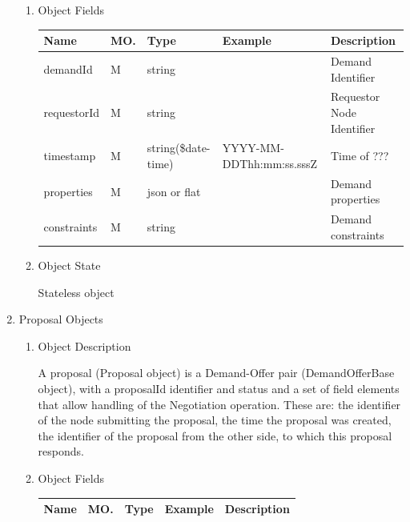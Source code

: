 \begin{enumerate}
\begin{enumerate}

\item Object Fields

\begin{center}
\begin{tabular}{|p{3cm}|l|p{3cm}|p{3cm}|p{4cm}|} 
\hline
\rowcolor{lightgray}	Name	& MO.	& Type	& Example & 	Description \\
\hline

demandId 	& M & string  & 		& Demand Identifier \\
\hline 		

requestorId & M & string  & 		& Requestor Node Identifier \\
\hline

timestamp	& M	& 	string(\$date-time)	& YYYY-MM-DDThh:mm:ss.sssZ	&	Time of ???  \\
\hline

properties	& M	& 	json or flat	&		&	Demand properties \\ 
\hline

constraints	& M	& 	string	&		&	Demand constraints \\ 
\hline

\end{tabular}
\end{center}


\item Object State

Stateless object

\end{enumerate}

\item Proposal Objects

\begin{enumerate}

\item Object Description

A proposal (Proposal object) is a Demand-Offer pair (DemandOfferBase object), with a proposalId identifier and status
and a set of field elements that allow handling of the Negotiation operation. These are: the identifier of the node submitting the proposal,
the time the proposal was created, the identifier of the proposal from the other side, to which this proposal responds.

\item Object Fields

\begin{center}
\begin{tabular}{|p{3cm}|l|p{3cm}|p{3cm}|p{4cm}|} 
\hline
\rowcolor{lightgray}	Name	& MO.	& Type	& Example & 	Description \\
\hline


\end{tabular}
\end{center}
\end{enumerate}
\end{enumerate}
